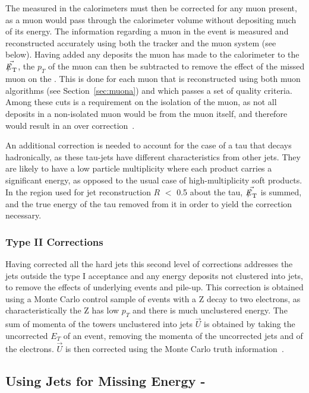 The \met measured in the calorimeters must then be corrected for any muon present, as a muon would pass through the calorimeter volume without depositing much of its energy. The information regarding a muon in the event is measured and reconstructed accurately using both the tracker and the muon system (see below). Having added any deposits the muon has made to the calorimeter to the $\vec{\met}$, the $p_{T}$ of the muon can then be subtracted to remove the effect of the missed muon on the \met. This is done for each muon that is reconstructed using both muon algorithms (see Section~\ref{sec:muona}) and which passes a set of quality criteria. Among these cuts is a requirement on the isolation of the muon, as not all deposits in a non-isolated muon would be from the muon itself, and therefore would result in an over correction~\cite{etmissnote}. 

An additional correction is needed to account for the case of a tau that decays hadronically, as these tau-jets have different characteristics from other jets. They are likely to have a low particle multiplicity where each product carries a significant energy, as opposed to the usual case of high-multiplicity soft products. In the region used for jet reconstruction $R$ $<$ 0.5 about the tau, $\vec{\met}$ is summed, and the true energy of the tau removed from it in order to yield the correction necessary.  

\subsubsection{Type II Corrections}

Having corrected all the hard jets this second level of corrections addresses the jets outside the type I acceptance and any energy deposits not clustered into jets, to remove the effects of underlying events and pile-up. This correction is obtained using a Monte Carlo control sample of events with a Z decay to two electrons, as characteristically the Z has low $p_{T}$ and there is much unclustered energy. The sum of momenta of the towers unclustered into jets $\vec{U}$ is obtained by taking the uncorrected $E_{T}$ of an event, removing the momenta of the uncorrected jets and of the electrons. $\vec{U}$ is then corrected using the Monte Carlo truth information~\cite{JME-10-004}. 


\subsection{Using Jets for Missing Energy - \MHT}

